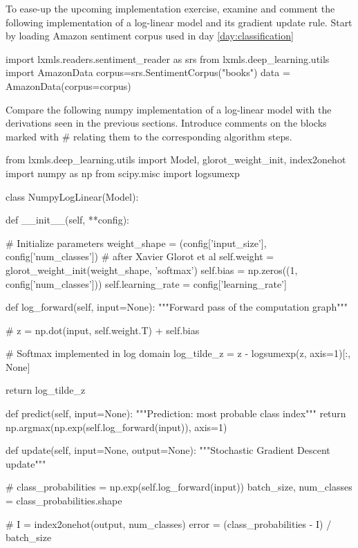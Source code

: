 \begin{exercise}
\label{exercise:exerciseNumpy1}
To ease-up the upcoming implementation exercise, examine and comment the following implementation of a log-linear model and its gradient update rule.
Start by loading Amazon sentiment corpus used in day \ref{day:classification}
\begin{python}
import lxmls.readers.sentiment_reader as srs
from lxmls.deep_learning.utils import AmazonData
corpus=srs.SentimentCorpus("books")
data = AmazonData(corpus=corpus)
\end{python}
Compare the following numpy implementation of a log-linear model with the derivations seen in the previous sections. Introduce comments on the blocks marked with \# relating them to the corresponding algorithm steps.
\begin{python}
from lxmls.deep_learning.utils import Model, glorot_weight_init, index2onehot
import numpy as np
from scipy.misc import logsumexp

class NumpyLogLinear(Model):

    def __init__(self, **config):

        # Initialize parameters
        weight_shape = (config['input_size'], config['num_classes'])
        # after Xavier Glorot et al
        self.weight = glorot_weight_init(weight_shape, 'softmax')
        self.bias = np.zeros((1, config['num_classes']))
        self.learning_rate = config['learning_rate']

    def log_forward(self, input=None):
        """Forward pass of the computation graph"""

        #
        z = np.dot(input, self.weight.T) + self.bias

        # Softmax implemented in log domain
        log_tilde_z = z - logsumexp(z, axis=1)[:, None]

        return log_tilde_z

    def predict(self, input=None):
        """Prediction: most probable class index"""
        return np.argmax(np.exp(self.log_forward(input)), axis=1)

    def update(self, input=None, output=None):
        """Stochastic Gradient Descent update"""

        #
        class_probabilities = np.exp(self.log_forward(input))
        batch_size, num_classes = class_probabilities.shape

        #
        I = index2onehot(output, num_classes)
        error = (class_probabilities - I) / batch_size


\end{python}
\end{exercise}
